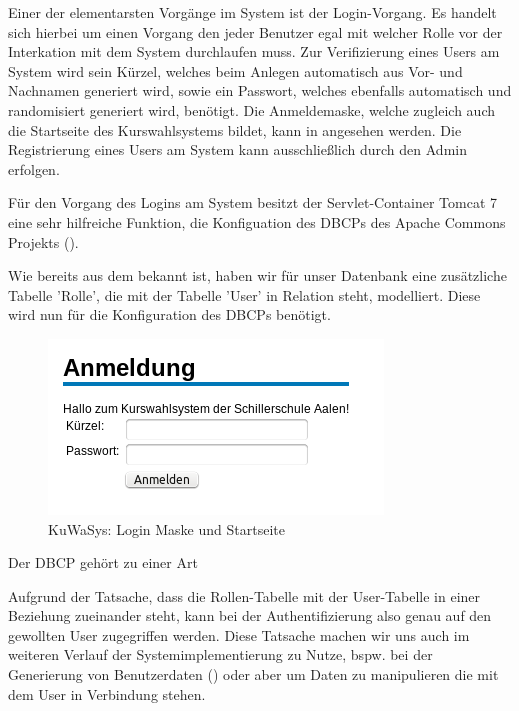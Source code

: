 Einer der elementarsten Vorgänge im System ist der Login-Vorgang. Es handelt sich hierbei um einen Vorgang den jeder Benutzer egal mit welcher Rolle vor der Interkation mit dem System durchlaufen muss. Zur Verifizierung eines Users am System wird sein Kürzel, welches beim Anlegen automatisch aus Vor- und Nachnamen generiert wird, sowie ein Passwort, welches ebenfalls automatisch und randomisiert generiert wird, benötigt. Die Anmeldemaske, welche zugleich auch die Startseite des Kurswahlsystems bildet, kann in  angesehen werden. Die Registrierung eines Users am System kann ausschließlich durch den Admin erfolgen.

Für den Vorgang des Logins am System besitzt der Servlet-Container Tomcat 7 eine sehr hilfreiche Funktion, die Konfiguation des \ac{DBCP}s des Apache Commons Projekts (\cite{tomcatDBCP}). 

Wie bereits aus dem  bekannt ist, haben wir für unser Datenbank eine zusätzliche Tabelle 'Rolle', die mit der Tabelle 'User' in Relation steht, modelliert. Diese wird nun für die Konfiguration des \ac{DBCP}s benötigt.

\begin{figure}
 \begin{center}
   \includegraphics[scale=0.7]{img/login_KuWaSys.png}
 \end{center}
 \caption[\textbf{KuWaSys: Login Maske und Startseite}]{KuWaSys: Login Maske und Startseite}
 \label{fig:login_KuWaSys}
\end{figure}

Der \ac{DBCP} gehört zu einer Art

Aufgrund der Tatsache, dass die Rollen-Tabelle mit der User-Tabelle in einer Beziehung zueinander steht, kann bei der Authentifizierung also genau auf den gewollten User zugegriffen werden. Diese Tatsache machen wir uns auch im weiteren Verlauf der Systemimplementierung zu Nutze, bspw. bei der Generierung von Benutzerdaten () oder aber um Daten zu manipulieren die mit dem User in Verbindung stehen.

